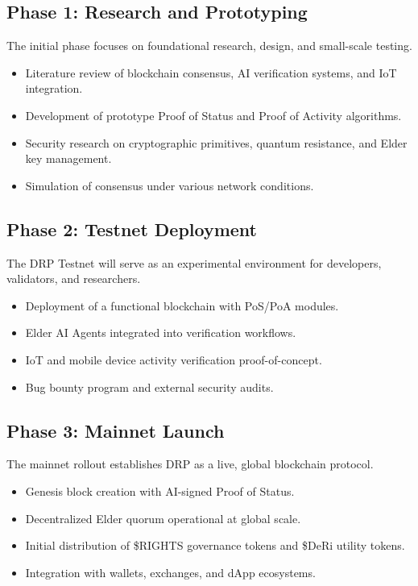 \documentclass[11pt,a4paper]{article}
\begin{document}
\subsection{Phase 1: Research and Prototyping}
The initial phase focuses on foundational research, design, and small-scale testing.
\begin{itemize}
    \item Literature review of blockchain consensus, AI verification systems, and IoT integration.
    \item Development of prototype Proof of Status and Proof of Activity algorithms.
    \item Security research on cryptographic primitives, quantum resistance, and Elder key management.
    \item Simulation of consensus under various network conditions.
\end{itemize}

\subsection{Phase 2: Testnet Deployment}
The DRP Testnet will serve as an experimental environment for developers, validators, and researchers.
\begin{itemize}
    \item Deployment of a functional blockchain with PoS/PoA modules.
    \item Elder AI Agents integrated into verification workflows.
    \item IoT and mobile device activity verification proof-of-concept.
    \item Bug bounty program and external security audits.
\end{itemize}

\subsection{Phase 3: Mainnet Launch}
The mainnet rollout establishes DRP as a live, global blockchain protocol.
\begin{itemize}
    \item Genesis block creation with AI-signed Proof of Status.
    \item Decentralized Elder quorum operational at global scale.
    \item Initial distribution of \$RIGHTS governance tokens and \$DeRi utility tokens.
    \item Integration with wallets, exchanges, and dApp ecosystems.
\end{itemize}
\end{document}
